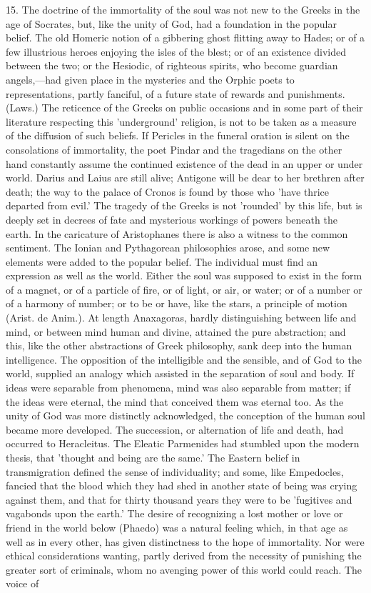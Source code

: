 \documentclass[11pt,letter]{article}
\begin{document}
\par  15. The doctrine of the immortality of the soul was not new to the Greeks in the age of Socrates, but, like the unity of God, had a foundation in the popular belief. The old Homeric notion of a gibbering ghost flitting away to Hades; or of a few illustrious heroes enjoying the isles of the blest; or of an existence divided between the two; or the Hesiodic, of righteous spirits, who become guardian angels,—had given place in the mysteries and the Orphic poets to representations, partly fanciful, of a future state of rewards and punishments. (Laws.) The reticence of the Greeks on public occasions and in some part of their literature respecting this 'underground' religion, is not to be taken as a measure of the diffusion of such beliefs. If Pericles in the funeral oration is silent on the consolations of immortality, the poet Pindar and the tragedians on the other hand constantly assume the continued existence of the dead in an upper or under world. Darius and Laius are still alive; Antigone will be dear to her brethren after death; the way to the palace of Cronos is found by those who 'have thrice departed from evil.' The tragedy of the Greeks is not 'rounded' by this life, but is deeply set in decrees of fate and mysterious workings of powers beneath the earth. In the caricature of Aristophanes there is also a witness to the common sentiment. The Ionian and Pythagorean philosophies arose, and some new elements were added to the popular belief. The individual must find an expression as well as the world. Either the soul was supposed to exist in the form of a magnet, or of a particle of fire, or of light, or air, or water; or of a number or of a harmony of number; or to be or have, like the stars, a principle of motion (Arist. de Anim.). At length Anaxagoras, hardly distinguishing between life and mind, or between mind human and divine, attained the pure abstraction; and this, like the other abstractions of Greek philosophy, sank deep into the human intelligence. The opposition of the intelligible and the sensible, and of God to the world, supplied an analogy which assisted in the separation of soul and body. If ideas were separable from phenomena, mind was also separable from matter; if the ideas were eternal, the mind that conceived them was eternal too. As the unity of God was more distinctly acknowledged, the conception of the human soul became more developed. The succession, or alternation of life and death, had occurred to Heracleitus. The Eleatic Parmenides had stumbled upon the modern thesis, that 'thought and being are the same.' The Eastern belief in transmigration defined the sense of individuality; and some, like Empedocles, fancied that the blood which they had shed in another state of being was crying against them, and that for thirty thousand years they were to be 'fugitives and vagabonds upon the earth.' The desire of recognizing a lost mother or love or friend in the world below (Phaedo) was a natural feeling which, in that age as well as in every other, has given distinctness to the hope of immortality. Nor were ethical considerations wanting, partly derived from the necessity of punishing the greater sort of criminals, whom no avenging power of this world could reach. The voice of 
\end{document}
